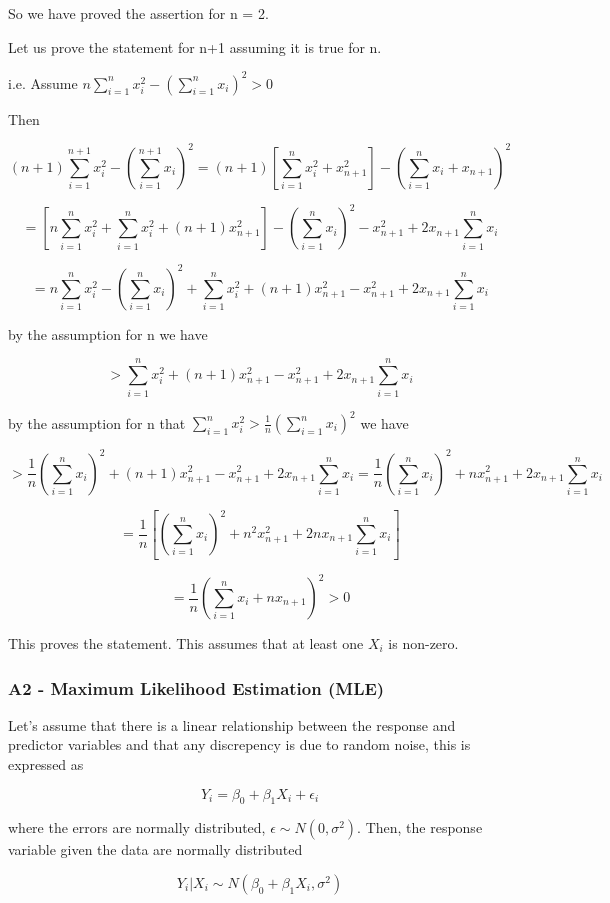 \documentclass[11pt]{article}
\begin{document}
So we have proved the assertion for n = 2.

Let us prove the statement for n+1 assuming it is true for n.

i.e. Assume \(n \sum_{i=1}^n x_i^2 - (\sum_{i=1}^n x_i)^2 > 0\)

Then

\[(n+1) \sum_{i=1}^{n+1} x_i^2 - (\sum_{i=1}^{n+1} x_i)^2 = (n+1)[\sum_{i=1}^{n} x_i^2 + x_{n+1}^2] - (\sum_{i=1}^{n} x_i + x_{n+1})^2\]

\[= [n \sum_{i=1}^n x_i^2 + \sum_{i=1}^n x_i^2 + (n+1)x_{n+1}^2] - (\sum_{i=1}^n x_i)^2 - x_{n+1}^2 + 2x_{n+1} \sum_{i=1}^n x_i\]

\[= n \sum_{i=1}^n x_i^2 - (\sum_{i=1}^n x_i)^2 + \sum_{i=1}^n x_i^2 + (n+1)x_{n+1}^2 - x_{n+1}^2 + 2x_{n+1} \sum_{i=1}^n x_i\]

by the assumption for n we have

\[> \sum_{i=1}^n x_i^2 + (n+1)x_{n+1}^2 - x_{n+1}^2 + 2x_{n+1} \sum_{i=1}^n x_i\]

by the assumption for n that
\(\sum_{i=1}^n x_i^2 > \frac{1}{n}(\sum_{i=1}^n x_i)^2\) we have

\[> \frac{1}{n}(\sum_{i=1}^n x_i)^2 + (n+1)x_{n+1}^2 - x_{n+1}^2 + 2x_{n+1} \sum_{i=1}^n x_i =\frac{1}{n}(\sum_{i=1}^n x_i)^2 + nx_{n+1}^2 + 2x_{n+1} \sum_{i=1}^n x_i \]

\[= \frac{1}{n}[(\sum_{i=1}^n x_i)^2 + n^2 x_{n+1}^2 + 2n x_{n+1} \sum_{i=1}^n x_i]\]

\[=\frac{1}{n}\left( \sum_{i=1}^n x_i + n x_{n+1} \right)^2 > 0\]

This proves the statement. This assumes that at least one \(X_i\) is
non-zero.

    \subsubsection{A2 - Maximum Likelihood Estimation
(MLE)}\label{a2---maximum-likelihood-estimation-mle}

Let's assume that there is a linear relationship between the response
and predictor variables and that any discrepency is due to random noise,
this is expressed as

\[Y_i = \beta_0 + \beta_1 X_i + \epsilon_i\]

where the errors are normally distributed,
\(\epsilon \sim N(0,\sigma^2)\). Then, the response variable given the
data are normally distributed

\[Y_i|X_i \sim N(\beta_0 + \beta_1 X_i,\sigma^2)\]
\end{document}
